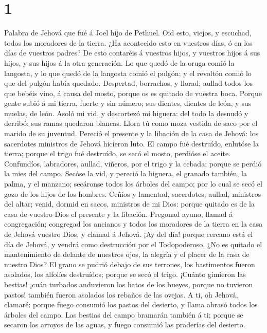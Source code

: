 \hypertarget{section}{%
\section{1}\label{section}}

 Palabra de Jehová que fué á Joel hijo de Pethuel.
 Oid esto, viejos, y escuchad, todos los moradores de la
tierra. ¿Ha acontecido esto en vuestros días, ó en los días de vuestros
padres?  De esto contaréis á vuestros hijos, y vuestros
hijos á sus hijos, y sus hijos á la otra generación.  Lo que
quedó de la oruga comió la langosta, y lo que quedó de la langosta comió
el pulgón; y el revoltón comió lo que del pulgón había quedado.
 Despertad, borrachos, y llorad; aullad todos los que bebéis
vino, á causa del mosto, porque os es quitado de vuestra boca.
 Porque gente subió á mi tierra, fuerte y sin número; sus
dientes, dientes de león, y sus muelas, de león.  Asoló mi
vid, y descortezó mi higuera: del todo la desnudó y derribó: sus ramas
quedaron blancas.  Llora tú como moza vestida de saco por el
marido de su juventud.  Pereció el presente y la libación de
la casa de Jehová: los sacerdotes ministros de Jehová hicieron luto.
 El campo fué destruído, enlutóse la tierra; porque el
trigo fué destruído, se secó el mosto, perdióse el aceite. 
Confundíos, labradores, aullad, viñeros, por el trigo y la cebada;
porque se perdió la mies del campo.  Secóse la vid, y
pereció la higuera, el granado también, la palma, y el manzano;
secáronse todos los árboles del campo; por lo cual se secó el gozo de
los hijos de los hombres.  Ceñíos y lamentad, sacerdotes;
aullad, ministros del altar; venid, dormid en sacos, ministros de mi
Dios: porque quitado es de la casa de vuestro Dios el presente y la
libación.  Pregonad ayuno, llamad á congregación; congregad
los ancianos y todos los moradores de la tierra en la casa de Jehová
vuestro Dios, y clamad á Jehová.  ¡Ay del día! porque
cercano está el día de Jehová, y vendrá como destrucción por el
Todopoderoso.  ¿No es quitado el mantenimiento de delante
de nuestros ojos, la alegría y el placer de la casa de nuestro Dios?
 El grano se pudrió debajo de sus terrones, los bastimentos
fueron asolados, los alfolíes destruídos; porque se secó el trigo.
 ¡Cuánto gimieron las bestias! ¡cuán turbados anduvieron
los hatos de los bueyes, porque no tuvieron pastos! también fueron
asolados los rebaños de las ovejas.  A ti, oh Jehová,
clamaré: porque fuego consumió los pastos del desierto, y llama abrasó
todos los árboles del campo.  Las bestias del campo
bramarán también á ti; porque se secaron los arroyos de las aguas, y
fuego consumió las praderías del desierto.

